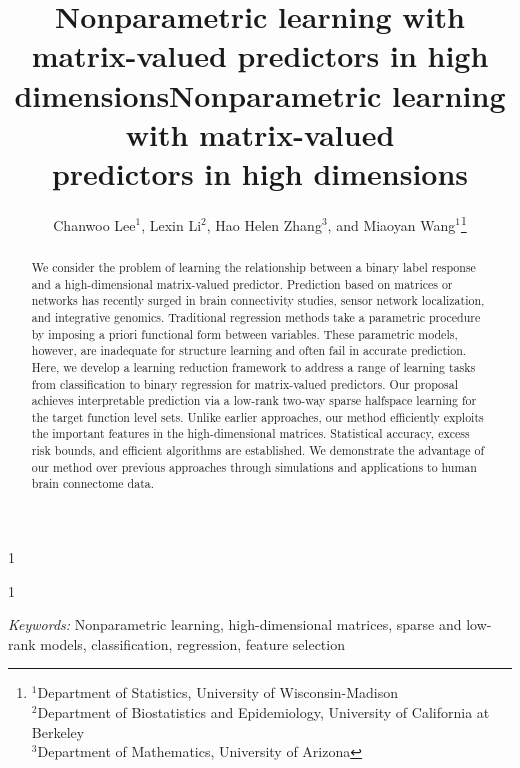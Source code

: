 \documentclass[11pt]{article}
\newcommand{\blind}{1}
\theoremstyle{plain}
\theoremstyle{definition}
\begin{document}
\blind
{   \date{}
  \title{\bf Nonparametric learning with matrix-valued predictors in high dimensions}
\author{ Chanwoo Lee$^{1}$, Lexin Li$^2$, Hao Helen Zhang$^3$, and Miaoyan Wang$^1$\footnote{
\hspace*{-.6cm}$^1$Department of Statistics, University of Wisconsin-Madison\\
$^2$Department of Biostatistics and Epidemiology, University of California at Berkeley\\
$^3$Department of Mathematics, University of Arizona}
}

    \maketitle
} \fi

\blind
{
 \date{}
  \title{\bf Nonparametric learning with matrix-valued \\predictors in high dimensions}
\author{}
\maketitle
} \fi

\begin{abstract}
We consider the problem of learning the relationship between a binary label response and a high-dimensional matrix-valued predictor. Prediction based on matrices or networks has recently surged in brain connectivity studies, sensor network localization, and integrative genomics. Traditional regression methods take a parametric procedure by imposing a priori functional form between variables. These parametric models, however, are inadequate for structure learning and often fail in accurate prediction. Here, we develop a learning reduction framework to address a range of learning tasks from classification to binary regression for matrix-valued predictors. Our proposal achieves interpretable prediction via a low-rank two-way sparse halfspace learning for the target function level sets. Unlike earlier approaches, our method efficiently exploits the important features in the high-dimensional matrices. Statistical accuracy, excess risk bounds, and efficient algorithms are established. We demonstrate the advantage of our method over previous approaches through simulations and applications to human brain connectome data. 

\end{abstract}
\noindent%
{\it Keywords:}  Nonparametric learning, high-dimensional matrices, sparse and low-rank models, classification, regression, feature selection
\end{document}
